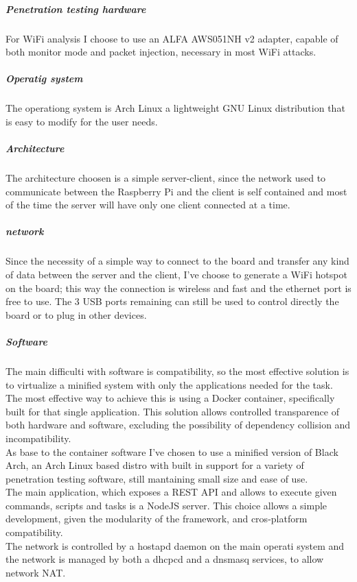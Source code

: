 \documentclass[../PiTest.tex]{subfiles}
\begin{document}
        \subparagraph{Penetration testing hardware}
            For WiFi analysis I choose to use an ALFA AWS051NH v2 adapter, capable of both monitor mode and packet injection, necessary in most WiFi attacks.

        \subparagraph{Operatig system}
            The operationg system is Arch Linux a lightweight GNU Linux distribution that is easy to modify for the user needs.

        \subparagraph{Architecture}
            The architecture choosen is a simple server-client, since the network used to communicate between the Raspberry Pi and the client is self contained and most of the time the server will have only one client connected at a time.

        \subparagraph{network}
            Since the necessity of a simple way to connect to the board and transfer any kind of data between the server and the client, I've choose to generate a WiFi hotspot on the board; this way the connection is wireless and fast and the ethernet port is free to use. The 3 USB ports remaining can still be used to control directly the board or to plug in other devices.

        \subparagraph{Software}
            The main difficulti with software is compatibility, so the most effective solution is to virtualize a minified system with only the applications needed for the task. The most effective way to achieve this is using a Docker container, specifically built for that single application. This solution allows controlled transparence of both hardware and software, excluding the possibility of dependency collision and incompatibility.\\
            As base to the container software I've chosen to use a minified version of Black Arch, an Arch Linux based distro with built in support for a variety of penetration testing software, still mantaining small size and ease of use. \\
            The main application, which exposes a REST API and allows to execute given commands, scripts and tasks is a NodeJS server. This choice allows a simple development, given the modularity of the framework, and cros-platform compatibility.\\
            The network is controlled by a hostapd daemon on the main operati system and the network is managed by both a dhcpcd and a dnsmasq services, to allow network NAT.


			
\end{document}
